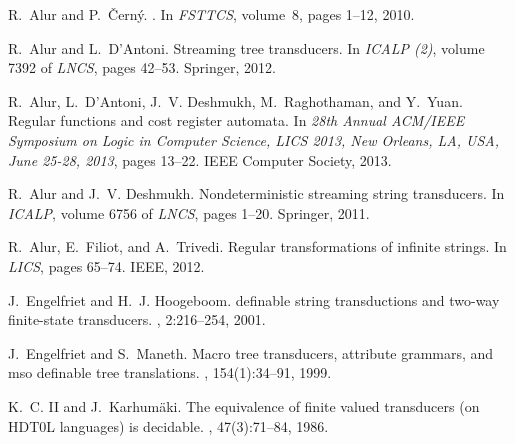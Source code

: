 \documentclass{llncs}
\begin{document}



\begin{thebibliography}{1}

R.~Alur and P.~{\v C}ern\'y.
.
\newblock In {\em FSTTCS}, volume~8, pages 1--12, 2010.

R.~Alur and L.~D'Antoni.
\newblock Streaming tree transducers.
\newblock In {\em ICALP (2)}, volume 7392 of {\em LNCS}, pages 42--53.
  Springer, 2012.

R.~Alur, L.~D'Antoni, J.~V. Deshmukh, M.~Raghothaman, and Y.~Yuan.
\newblock Regular functions and cost register automata.
\newblock In {\em 28th Annual {ACM/IEEE} Symposium on Logic in Computer
  Science, {LICS} 2013, New Orleans, LA, USA, June 25-28, 2013}, pages 13--22.
  {IEEE} Computer Society, 2013.

R.~Alur and J.~V. Deshmukh.
\newblock Nondeterministic streaming string transducers.
\newblock In {\em ICALP}, volume 6756 of {\em LNCS}, pages 1--20. Springer,
  2011.

R.~Alur, E.~Filiot, and A.~Trivedi.
\newblock Regular transformations of infinite strings.
\newblock In {\em LICS}, pages 65--74. IEEE, 2012.

J.~Engelfriet and H.~J. Hoogeboom.
 definable string transductions and two-way finite-state
  transducers.
, 2:216--254, 2001.

J.~Engelfriet and S.~Maneth.
\newblock Macro tree transducers, attribute grammars, and mso definable tree
  translations.
, 154(1):34--91, 1999.

K.~C. II and J.~Karhum{\"{a}}ki.
\newblock The equivalence of finite valued transducers (on {HDT0L} languages)
  is decidable.
, 47(3):71--84, 1986.

\end{thebibliography}
 
\end{document}
